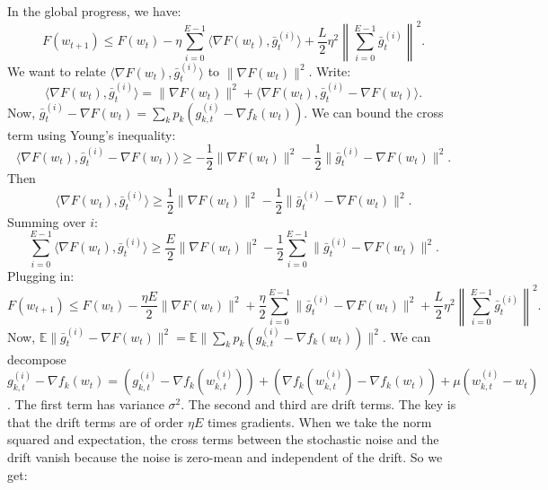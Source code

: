\documentclass{article}
\begin{document}
In the global progress, we have:
\begin{equation}
    F(w_{t+1}) \leq F(w_t) - \eta \sum_{i=0}^{E-1} \langle \nabla F(w_t), \bar{g}_t^{(i)} \rangle + \frac{L}{2} \eta^2 \left\| \sum_{i=0}^{E-1} \bar{g}_t^{(i)} \right\|^2.
\end{equation}
We want to relate $\langle \nabla F(w_t), \bar{g}_t^{(i)} \rangle$ to $\| \nabla F(w_t) \|^2$. Write:
\begin{equation}
    \langle \nabla F(w_t), \bar{g}_t^{(i)} \rangle = \| \nabla F(w_t) \|^2 + \langle \nabla F(w_t), \bar{g}_t^{(i)} - \nabla F(w_t) \rangle.
\end{equation}
Now, $\bar{g}_t^{(i)} - \nabla F(w_t) = \sum_k p_k (g_{k,t}^{(i)} - \nabla f_k(w_t))$. We can bound the cross term using Young's inequality:
\begin{equation}
    \langle \nabla F(w_t), \bar{g}_t^{(i)} - \nabla F(w_t) \rangle \geq -\frac{1}{2} \| \nabla F(w_t) \|^2 - \frac{1}{2} \| \bar{g}_t^{(i)} - \nabla F(w_t) \|^2.
\end{equation}
Then
\begin{equation}
    \langle \nabla F(w_t), \bar{g}_t^{(i)} \rangle \geq \frac{1}{2} \| \nabla F(w_t) \|^2 - \frac{1}{2} \| \bar{g}_t^{(i)} - \nabla F(w_t) \|^2.
\end{equation}
Summing over $i$:
\begin{equation}
    \sum_{i=0}^{E-1} \langle \nabla F(w_t), \bar{g}_t^{(i)} \rangle \geq \frac{E}{2} \| \nabla F(w_t) \|^2 - \frac{1}{2} \sum_{i=0}^{E-1} \| \bar{g}_t^{(i)} - \nabla F(w_t) \|^2.
\end{equation}
Plugging in:
\begin{equation}
    F(w_{t+1}) \leq F(w_t) - \frac{\eta E}{2} \| \nabla F(w_t) \|^2 + \frac{\eta}{2} \sum_{i=0}^{E-1} \| \bar{g}_t^{(i)} - \nabla F(w_t) \|^2 + \frac{L}{2} \eta^2 \left\| \sum_{i=0}^{E-1} \bar{g}_t^{(i)} \right\|^2.
\end{equation}
Now, $\mathbb{E} \| \bar{g}_t^{(i)} - \nabla F(w_t) \|^2 = \mathbb{E} \| \sum_k p_k (g_{k,t}^{(i)} - \nabla f_k(w_t)) \|^2$. We can decompose $g_{k,t}^{(i)} - \nabla f_k(w_t) = (g_{k,t}^{(i)} - \nabla f_k(w_{k,t}^{(i)})) + (\nabla f_k(w_{k,t}^{(i)}) - \nabla f_k(w_t)) + \mu (w_{k,t}^{(i)} - w_t)$. The first term has variance $\sigma^2$. The second and third are drift terms. The key is that the drift terms are of order $\eta E$ times gradients. When we take the norm squared and expectation, the cross terms between the stochastic noise and the drift vanish because the noise is zero-mean and independent of the drift. So we get:
\end{document}
